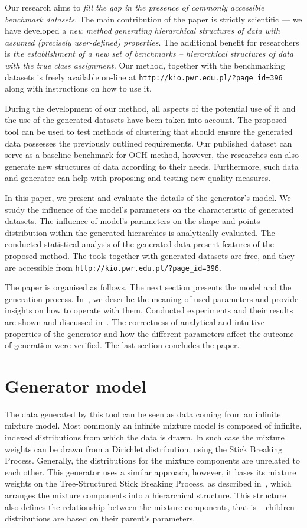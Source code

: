\documentclass{article}
\begin{document}
Our research aims to \textit{fill the gap in the presence of commonly accessible benchmark datasets}.
    The main contribution of the paper is strictly scientific --- we have developed a \textit{new method generating hierarchical structures of data with assumed (precisely user-defined) properties}. The additional benefit for researchers is \textit{the establishment of a new set of benchmarks -- hierarchical structures of data with the true class assignment.} Our method, together with the benchmarking datasets is freely available on-line at \texttt{http://kio.pwr.edu.pl/?page\_id=396} along with instructions on how to use it.

    During the development of our method, all aspects of the potential use of it and the use of the generated datasets have been taken into account. The proposed tool can be used to test methods of clustering that should ensure the generated data possesses the previously outlined requirements. Our published dataset can serve as a baseline benchmark for OCH method, however, the researches can also generate new structures of data according to their needs. Furthermore, such data and generator can help with proposing and testing new quality measures.  

In this paper, we present and evaluate the details of the generator's model. We study the influence of the model's parameters on the characteristic of generated datasets. The influence of model's parameters on the shape and points distribution within the generated hierarchies is analytically evaluated. The conducted statistical analysis of the generated data present features of the proposed method. The tools together with generated datasets are free, and they are accessible from \texttt{http://kio.pwr.edu.pl/?page\_id=396}.
    
    The paper is organised as follows. The next section presents the model and the generation process. In~, we describe the meaning of used parameters and provide insights on how to operate with them. Conducted experiments and their results are shown and discussed in~. The correctness of analytical and intuitive properties of the generator and how the different parameters affect the outcome of generation were verified. The last section concludes the paper.
%
\section{Generator model}
\label{model}
	The data generated by this tool can be seen as data coming from an infinite mixture model. Most commonly an infinite mixture model is composed of infinite, indexed distributions from which the data is drawn. In such case the mixture weights can be drawn from a Dirichlet distribution, using the Stick Breaking Process. Generally, the distributions for the mixture components are unrelated to each other. This generator uses a similar approach, however, it bases its mixture weights on the Tree-Structured Stick Breaking Process, as described in~\cite{ghahramani2010tree}, which arranges the mixture components into a hierarchical structure. This structure also defines the relationship between the mixture components, that is -- children distributions are based on their parent's parameters.
    
\end{document}
